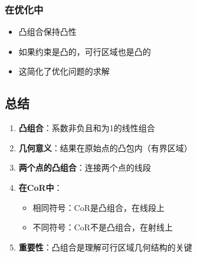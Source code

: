 \documentclass[12pt,a4paper]{article}
\begin{document}
\subsubsection{在优化中}

\begin{itemize}
\item 凸组合保持凸性
\item 如果约束是凸的，可行区域也是凸的
\item 这简化了优化问题的求解
\end{itemize}

\subsection{总结}

\begin{enumerate}
\item \textbf{凸组合}：系数非负且和为1的线性组合

\item \textbf{几何意义}：结果在原始点的凸包内（有界区域）

\item \textbf{两个点的凸组合}：连接两个点的线段

\item \textbf{在CoR中}：
  \begin{itemize}
  \item 相同符号：CoR是凸组合，在线段上
  \item 不同符号：CoR不是凸组合，在射线上
  \end{itemize}

\item \textbf{重要性}：凸组合是理解可行区域几何结构的关键
\end{enumerate}
\end{document}

